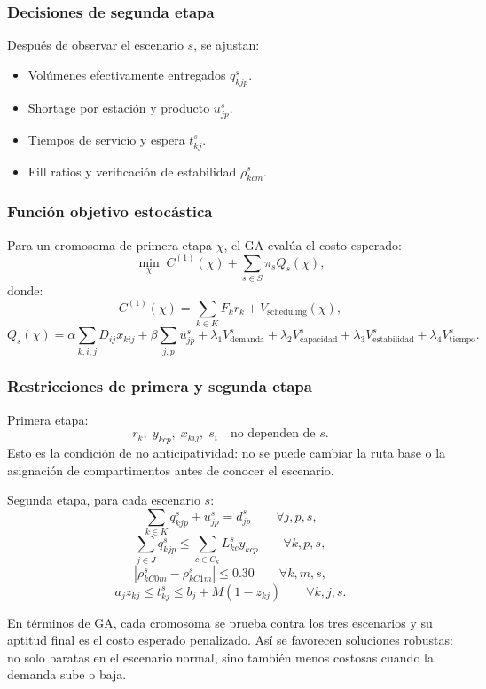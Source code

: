 \documentclass[11pt,letterpaper]{article}
\begin{document}
\subsubsection*{Decisiones de segunda etapa}
Después de observar el escenario \(s\), se ajustan:
\begin{itemize}[leftmargin=*]
    \item Volúmenes efectivamente entregados \(q_{kjp}^{s}\).
    \item Shortage por estación y producto \(u_{jp}^{s}\).
    \item Tiempos de servicio y espera \(t_{kj}^{s}\).
    \item Fill ratios y verificación de estabilidad \(\rho_{kcm}^{s}\).
\end{itemize}

\subsubsection*{Función objetivo estocástica}
Para un cromosoma de primera etapa \(\chi\), el GA evalúa el costo esperado:
\[
    \min_{\chi}\;
    C^{(1)}(\chi)
    +\sum_{s\in S}\pi_s Q_s(\chi),
\]
donde:
\[
    C^{(1)}(\chi)=
    \sum_{k\in K}F_kr_k
    +V_{\text{scheduling}}(\chi),
\]
\[
    Q_s(\chi)=
    \alpha\sum_{k,i,j}D_{ij}x_{kij}
    +\beta\sum_{j,p}u_{jp}^{s}
    +\lambda_1V_{\text{demanda}}^{s}
    +\lambda_2V_{\text{capacidad}}^{s}
    +\lambda_3V_{\text{estabilidad}}^{s}
    +\lambda_4V_{\text{tiempo}}^{s}.
\]

\subsubsection*{Restricciones de primera y segunda etapa}
Primera etapa:
\[
    r_k,\; y_{kcp},\; x_{kij},\; s_i
    \quad \text{no dependen de }s.
\]
Esto es la condición de no anticipatividad: no se puede cambiar la ruta base o la asignación
de compartimentos antes de conocer el escenario.

Segunda etapa, para cada escenario \(s\):
\[
    \sum_{k\in K}q_{kjp}^{s}+u_{jp}^{s}=d_{jp}^{s}
    \qquad \forall j,p,s,
\]
\[
    \sum_{j\in J}q_{kjp}^{s}\le
    \sum_{c\in C_k}L_{kc}^{s}y_{kcp}
    \qquad \forall k,p,s,
\]
\[
    |\rho_{kC0m}^{s}-\rho_{kC1m}^{s}|\le 0.30
    \qquad \forall k,m,s,
\]
\[
    a_jz_{kj}\le t_{kj}^{s}\le b_j+M(1-z_{kj})
    \qquad \forall k,j,s.
\]

En términos de GA, cada cromosoma se prueba contra los tres escenarios y su aptitud final
es el costo esperado penalizado. Así se favorecen soluciones robustas: no solo baratas en el
escenario normal, sino también menos costosas cuando la demanda sube o baja.
\end{document}
